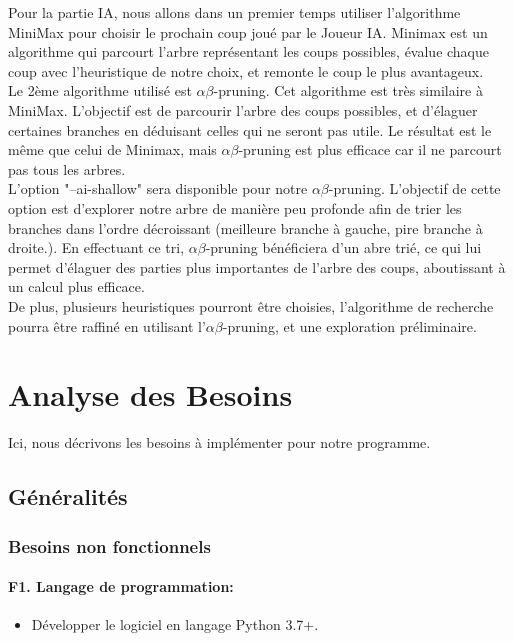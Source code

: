 \documentclass[a4paper,12pt]{article}
\begin{document}
Pour la partie IA, nous allons dans un premier temps utiliser l'algorithme
MiniMax pour choisir le prochain coup joué par le Joueur IA. Minimax est un
algorithme qui parcourt l'arbre représentant les coups possibles, évalue chaque
coup avec l'heuristique de notre choix, et remonte le coup le plus
avantageux.\\ Le 2ème algorithme utilisé est $\alpha\beta$-pruning. Cet
algorithme est très similaire à MiniMax. L'objectif est de parcourir l'arbre
des coups possibles, et d'élaguer certaines branches en déduisant celles qui ne
seront pas utile. Le résultat est le même que celui de Minimax, mais
$\alpha\beta$-pruning est plus efficace car il ne parcourt pas tous les
arbres.\\ L'option "--ai-shallow" sera disponible pour notre
$\alpha\beta$-pruning. L'objectif de cette option est d'explorer notre arbre de
manière peu profonde afin de trier les branches dans l'ordre décroissant
(meilleure branche à gauche, pire branche à droite.). En effectuant ce tri,
$\alpha\beta$-pruning bénéficiera d'un abre trié, ce qui lui permet d'élaguer
des parties plus importantes de l'arbre des coups, aboutissant à un calcul plus
efficace.\\ De plus, plusieurs heuristiques pourront être choisies,
l'algorithme de recherche pourra être raffiné en utilisant
l'$\alpha\beta$-pruning, et une exploration préliminaire.\\

\newpage
\section{Analyse des Besoins}
Ici, nous décrivons les besoins à implémenter pour notre programme.

\subsection{Généralités}

\subsubsection{Besoins non fonctionnels}

\paragraph{F1. Langage de programmation:}
\begin{itemize}
  \item Développer le logiciel en langage Python 3.7+.
\end{itemize}
\end{document}
